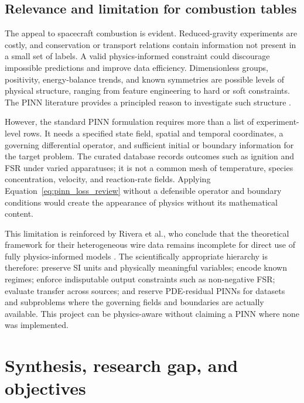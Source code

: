 \subsection{Relevance and limitation for combustion tables}

The appeal to spacecraft combustion is evident. Reduced-gravity experiments are costly, and conservation or transport relations contain information not present in a small set of labels. A valid physics-informed constraint could discourage impossible predictions and improve data efficiency. Dimensionless groups, positivity, energy-balance trends, and known symmetries are possible levels of physical structure, ranging from feature engineering to hard or soft constraints. The PINN literature provides a principled reason to investigate such structure \cite{raissi2019pinn,karniadakis2021physicsinformed}.

However, the standard PINN formulation requires more than a list of experiment-level rows. It needs a specified state field, spatial and temporal coordinates, a governing differential operator, and sufficient initial or boundary information for the target problem. The curated database records outcomes such as ignition and FSR under varied apparatuses; it is not a common mesh of temperature, species concentration, velocity, and reaction-rate fields. Applying Equation~\eqref{eq:pinn_loss_review} without a defensible operator and boundary conditions would create the appearance of physics without its mathematical content.

This limitation is reinforced by Rivera et al., who conclude that the theoretical framework for their heterogeneous wire data remains incomplete for direct use of fully physics-informed models \cite{riveraWireML}. The scientifically appropriate hierarchy is therefore: preserve SI units and physically meaningful variables; encode known regimes; enforce indisputable output constraints such as non-negative FSR; evaluate transfer across sources; and reserve PDE-residual PINNs for datasets and subproblems where the governing fields and boundaries are actually available. This project can be physics-aware without claiming a PINN where none was implemented.

\section{Synthesis, research gap, and objectives}

